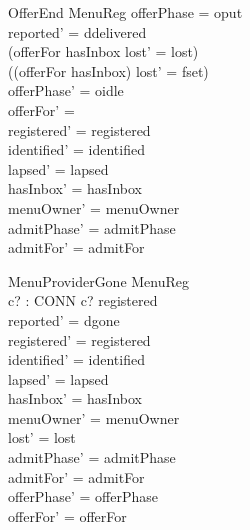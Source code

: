 \documentclass[a4paper,10pt,fleqn]{article}
\begin{document}
\begin{schema}{OfferEnd}
  \Delta MenuReg
\where
  offerPhase = oput \\
  reported' = ddelivered \\
  (offerFor \subseteq hasInbox \implies lost' = lost) \\
  (\lnot (offerFor \subseteq hasInbox) \implies lost' = fset) \\
  offerPhase' = oidle \\
  offerFor' = \emptyset \\
  registered' = registered \\
  identified' = identified \\
  lapsed' = lapsed \\
  hasInbox' = hasInbox \\
  menuOwner' = menuOwner \\
  admitPhase' = admitPhase \\
  admitFor' = admitFor
\end{schema}

\begin{schema}{MenuProviderGone}
  \Delta MenuReg \\
  c? : CONN
\where
  c? \notin registered \\
  reported' = dgone \\
  registered' = registered \\
  identified' = identified \\
  lapsed' = lapsed \\
  hasInbox' = hasInbox \\
  menuOwner' = menuOwner \\
  lost' = lost \\
  admitPhase' = admitPhase \\
  admitFor' = admitFor \\
  offerPhase' = offerPhase \\
  offerFor' = offerFor
\end{schema}
\end{document}
